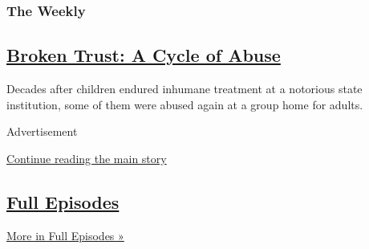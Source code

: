 \begin{enumerate}
\begin{enumerate}
    \hypertarget{the-weekly-4}{%
    \subsubsection{The Weekly}\label{the-weekly-4}}

    \hypertarget{broken-trust-a-cycle-of-abuse}{%
    \subsection{\texorpdfstring{\href{/2020/02/21/the-weekly/child-abuse-willowbrook-union-ave-bronx-si.html}{Broken
    Trust: A Cycle of
    Abuse}}{Broken Trust: A Cycle of Abuse}}\label{broken-trust-a-cycle-of-abuse}}

    Decades after children endured inhumane treatment at a notorious
    state institution, some of them were abused again at a group home
    for adults.
  \end{enumerate}
\end{enumerate}

Advertisement

\protect\hyperlink{after-mid1}{Continue reading the main story}

\hypertarget{full-episodes}{%
\subsection{\texorpdfstring{\href{/spotlight/full-episodes-of-the-weekly}{Full
Episodes}}{Full Episodes}}\label{full-episodes}}

\href{/spotlight/full-episodes-of-the-weekly}{More in Full Episodes »}

